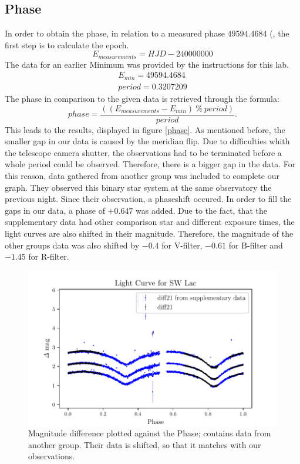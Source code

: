 \subsection{Phase}
  \label{sec:again}
  In order to obtain the phase, in relation to a measured phase $49594.4684$ (, the first step is to calculate the epoch.
  \begin{equation*}
    E_{measurements} = HJD - 240000000
  \end{equation*}
  The data for an earlier Minimum was provided by the 
  instructions for this lab. 
  \begin{align*}
    E_{min} = 49594.4684\\
    period = 0.3207209
  \end{align*}
  The phase in comparison to the given data is retrieved through the formula:
  \begin{equation}
    phase = \dfrac{((E_{measurements}-E_{min})\ \% \ period)}{period}.
  \end{equation}
  This leads to the results, displayed in figure \ref{phase}. As mentioned before, the smaller gap in our data is caused by the meridian flip. 
  Due to difficulties whith the telescope camera shutter, the observations had to be terminated
  before a whole period could be observed. Therefore, there is a bigger gap in the 
  data. For this reason, data gathered from another group was included to complete our graph. 
  They observed this binary star system at the same observatory the previous night. Since their
  observation, a phaseshift occured. In order to fill the gaps in our data,
  a phase of $+0.647$ was added. Due to the fact, that the supplementary data had other 
  comparison star and different exposure times, the light curves are also shifted in their
  magnitude. Therefore, the magnitude of the other groups data was also shifted
  by $-0.4$ for V-filter, $-0.61$ for B-filter and $-1.45$ for R-filter.\\
  \begin{figure}[H]
    \centering
    \includegraphics{gdPhase.pdf}
    \caption{Magnitude difference plotted against the Phase; contains data from another group. Their data is shifted, so that it matches with our observations.}
    \label{fig:phase}
  \end{figure}
 
